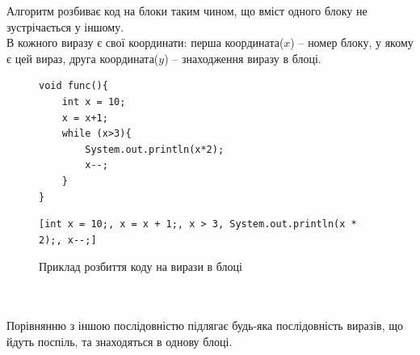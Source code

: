 \documentclass[a4paper, 14pt]{article}
\begin{document}
Алгоритм розбиває код на блоки таким чином, що вміст одного блоку не зустрічається у іншому. \\
В кожного виразу є свої координати: перша координата($x$) -- номер блоку, у якому є цей вираз, друга координата($y$) -- знаходження виразу в блоці.
\begin{figure}[h!]
\centering
\begin{minipage}{.4\textwidth}
\begin{lstlisting}[frame=none]
void func(){
	int x = 10;
	x = x+1;
	while (x>3){
		System.out.println(x*2);
		x--;
	}
}
\end{lstlisting}
\end{minipage}
\begin{minipage}{.5\textwidth}
\begin{lstlisting}[frame=none]
[int x = 10;, x = x + 1;, x > 3, System.out.println(x * 2);, x--;]
\end{lstlisting}
\end{minipage}
\caption{Приклад розбиття коду на вирази в блоці}
\end{figure} \\ \null \\
Порівнянню з іншою послідовністю підлягає будь-яка послідовність виразів, що йдуть поспіль, та знаходяться в однову блоці. \\
\end{document}
